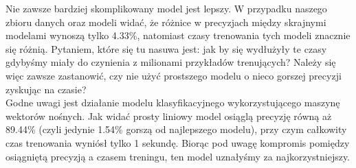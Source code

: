 \noindent Nie zawsze bardziej skomplikowany model jest lepszy. W przypadku naszego zbioru danych oraz modeli widać, że różnice w precyzjach między skrajnymi modelami wynoszą tylko 4.33\%, natomiast czasy trenowania tych modeli znacznie się różnią. Pytaniem, które się tu nasuwa jest: jak by się wydłużyły te czasy gdybyśmy miały do czynienia z milionami przykładów trenujących? Należy się więc zawsze zastanowić, czy nie użyć prostszego modelu o nieco gorszej precyzji zyskując na czasie? \\
Godne uwagi jest działanie modelu klasyfikacyjnego wykorzystującego maszynę wektorów nośnych. Jak widać prosty liniowy model osiąglą precyzję równą aż 89.44\% (czyli jedynie 1.54\% gorszą od najlepszego modelu), przy czym całkowity czas trenowania wyniósł tylko 1 sekundę. Biorąc pod uwagę kompromis pomiędzy osiągniętą precyzją a czasem treningu, ten model uznałyśmy za najkorzystniejszy. \\


